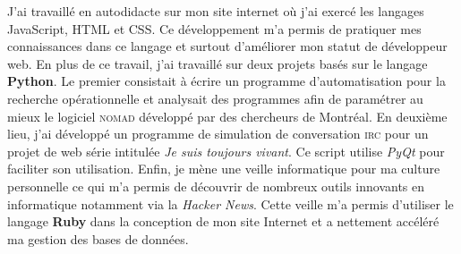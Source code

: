 J'ai travaillé en autodidacte sur mon site internet où j'ai exercé les langages JavaScript, HTML et CSS. Ce développement m'a permis de pratiquer mes connaissances dans ce langage et surtout d'améliorer mon statut de développeur web. En plus de ce travail, j'ai travaillé sur deux projets basés sur le langage \textbf{Python}. Le premier consistait à écrire un programme d'automatisation pour la recherche opérationnelle et analysait des programmes afin de paramétrer au mieux le logiciel \textsc{nomad} développé par des chercheurs de Montréal. En deuxième lieu, j'ai développé un programme de simulation de conversation \textsc{irc} pour un projet de web série intitulée \textit{Je suis toujours vivant}. Ce script utilise \textit{PyQt} pour faciliter son utilisation. Enfin, je mène une veille informatique pour ma culture personnelle ce qui m'a permis de découvrir de nombreux outils innovants en informatique notamment via la \textit{Hacker News}. Cette veille m'a permis d'utiliser le langage \textbf{Ruby} dans la conception de mon site Internet et a nettement accéléré ma gestion des bases de données.

\conclusion{}

\makeletterclosing
